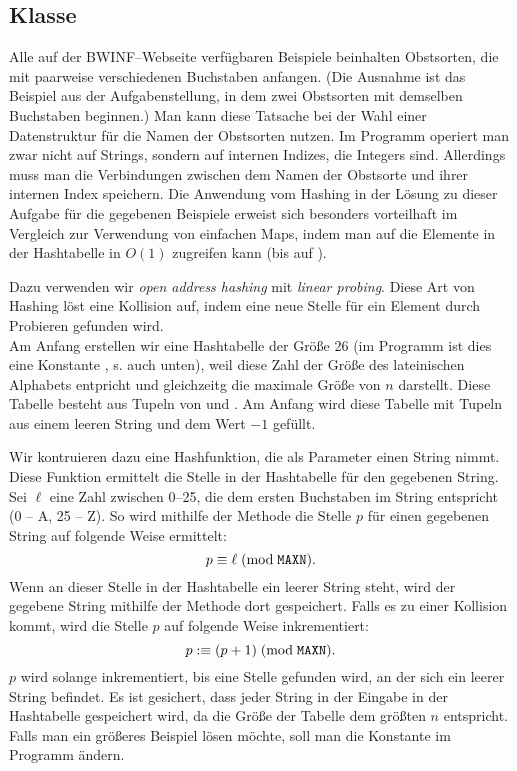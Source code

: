 \subsection{Klasse }
Alle auf der BWINF--Webseite verfügbaren Beispiele beinhalten Obstsorten, die mit paarweise verschiedenen 
Buchstaben anfangen.
(Die Ausnahme ist das Beispiel aus der Aufgabenstellung, in dem zwei Obstsorten mit demselben Buchstaben beginnen.)
Man kann diese Tatsache bei der Wahl einer Datenstruktur für die Namen der Obstsorten nutzen. 
Im Programm operiert man zwar nicht auf Strings, sondern auf internen Indizes, die Integers sind. 
Allerdings muss man die Verbindungen zwischen dem Namen der Obstsorte und ihrer internen Index speichern. 
Die Anwendung vom Hashing in der Lösung zu dieser Aufgabe für die gegebenen Beispiele
erweist sich besonders vorteilhaft im Vergleich zur Verwendung von einfachen Maps, indem
man auf die Elemente in der Hashtabelle in $O(1)$ zugreifen kann (bis auf ).

Dazu verwenden wir \textit{open address hashing} mit \textit{linear probing}.
Diese Art von Hashing löst eine Kollision auf, indem eine neue Stelle für ein Element durch Probieren 
gefunden wird.\\
Am Anfang erstellen wir eine Hashtabelle der Größe 26
(im Programm ist dies eine Konstante , s. auch  unten),
weil diese Zahl der Größe des lateinischen Alphabets entpricht und gleichzeitg
die maximale Größe von $n$ darstellt. 
Diese Tabelle besteht aus Tupeln von  und .
Am Anfang wird diese Tabelle mit Tupeln aus einem leeren String und dem Wert $-1$ gefüllt.

Wir kontruieren dazu eine Hashfunktion, die als Parameter einen String nimmt. 
Diese Funktion ermittelt die Stelle in der Hashtabelle für den gegebenen String.
Sei $\ell$ eine Zahl zwischen 0--25, die dem ersten Buchstaben im String
entspricht (0 -- A, 25 -- Z).
So wird mithilfe der Methode  die Stelle $p$ für einen gegebenen String 
auf folgende Weise ermittelt:
\[
p \equiv \ell\; (\textrm{mod}\; \texttt{MAXN}).
\]
Wenn an dieser Stelle in der Hashtabelle ein leerer String steht,
wird der gegebene String mithilfe der Methode  dort gespeichert.
Falls es zu einer Kollision kommt, wird die Stelle $p$ auf folgende Weise inkrementiert:
\[
p :\equiv (p + 1)\; (\textrm{mod}\; \texttt{MAXN}). 
\]
$p$ wird solange inkrementiert, bis eine Stelle gefunden wird, an der sich ein leerer String befindet.
Es ist gesichert, dass jeder String in der Eingabe in der Hashtabelle gespeichert wird, da
die Größe der Tabelle dem größten $n$ entspricht.
Falls man ein größeres Beispiel lösen möchte, soll man die Konstante  im Programm ändern.

